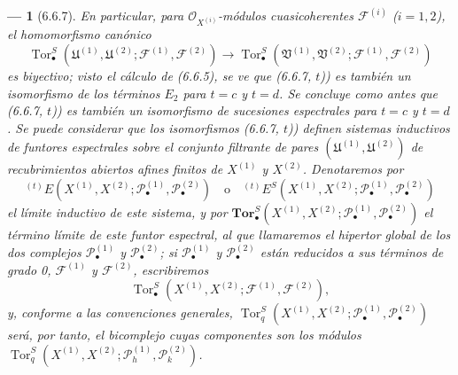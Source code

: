 \documentclass[10pt,oneside,openany]{book}
\theoremstyle{egaenv}\newtheorem*{env}{---}
\theoremstyle{egastatement}
\theoremstyle{egadescription}
\newcommand{\oldpage}[2][]{\marginnote{\normalfont\scriptsize\textbf{#1}\,|\,#2}\ignorespaces}
\begin{document}
\begin{env}[6.6.7]
En particular, para $\mathscr O_{X^{(i)}}$-módulos cuasicoherentes
$\mathscr F^{(i)}$ ($i=1,2$), el homomorfismo canónico
\[
  \operatorname{Tor}_\bullet^S
  (\mathfrak U^{(1)},\mathfrak U^{(2)};
   \mathscr F^{(1)},\mathscr F^{(2)})
  \longrightarrow
  \operatorname{Tor}_\bullet^S
  (\mathfrak V^{(1)},\mathfrak V^{(2)};
   \mathscr F^{(1)},\mathscr F^{(2)})
\]
es biyectivo; visto el cálculo de (6.6.5), se ve que (6.6.7, $t$)) es también
un isomorfismo de los términos $E_2$ para $t=c$ y $t=d$. Se concluye como
antes que (6.6.7, $t$)) es también un isomorfismo de sucesiones espectrales
para $t=c$ y $t=d$.
\oldpage[III]{157}
Se puede considerar que los isomorfismos (6.6.7, $t$)) definen sistemas
inductivos de funtores espectrales sobre el conjunto filtrante de pares
$(\mathfrak U^{(1)},\mathfrak U^{(2)})$ de recubrimientos abiertos afines
finitos de $X^{(1)}$ y $X^{(2)}$. Denotaremos por
\[
  {}^{(t)}E
  (X^{(1)},X^{(2)};
   \mathscr P_\bullet^{(1)},\mathscr P_\bullet^{(2)})
  \quad\text{o}\quad
  {}^{(t)}E^S
  (X^{(1)},X^{(2)};
   \mathscr P_\bullet^{(1)},\mathscr P_\bullet^{(2)})
\]
el límite inductivo de este sistema, y por
$\mathbf{Tor}_\bullet^S
(X^{(1)},X^{(2)};\mathscr P_\bullet^{(1)},\mathscr P_\bullet^{(2)})$
el término límite de este funtor espectral, al que llamaremos el
\emph{hipertor global} de los dos complejos $\mathscr P_\bullet^{(1)}$ y
$\mathscr P_\bullet^{(2)}$; si $\mathscr P_\bullet^{(1)}$ y
$\mathscr P_\bullet^{(2)}$ están reducidos a sus términos de grado 0,
$\mathscr F^{(1)}$ y $\mathscr F^{(2)}$, escribiremos
\[
  \operatorname{Tor}_\bullet^S
  (X^{(1)},X^{(2)};\mathscr F^{(1)},\mathscr F^{(2)}),
\]
y, conforme a las convenciones generales,
$
  \operatorname{Tor}_q^S
  (X^{(1)},X^{(2)};\mathscr P_\bullet^{(1)},\mathscr P_\bullet^{(2)})
$
será, por tanto, el bicomplejo cuyas componentes son los módulos
$
  \operatorname{Tor}_q^S
  (X^{(1)},X^{(2)};\mathscr P_h^{(1)},\mathscr P_k^{(2)})$.
\end{env}
\end{document}
